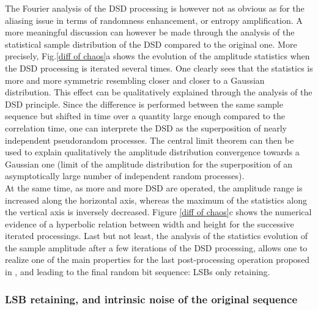 The Fourier analysis of the DSD processing is however not as obvious
as for the aliasing issue in terms of randomness enhancement, or
entropy amplification. A more meaningful discussion can however be
made through the analysis of the statistical sample distribution of
the DSD compared to the original one. More precisely, Fig.\ref{diff of
  chaos}a shows the evolution of the amplitude statistics when the DSD
processing is iterated several times. One clearly sees that the
statistics is more and more symmetric resembling closer and closer to
a Gaussian distribution. This effect can be qualitatively explained
through the analysis of the DSD principle. Since the difference is
performed between the same sample sequence but shifted in time over a
quantity large enough compared to the correlation time, one can
interprete the DSD as the superposition of nearly independent
pseudorandom processes. The central limit theorem can then be used to
explain qualitatively the amplitude distribution convergence towards a
Gaussian one (limit of the amplitude distribution for the
superposition of an asymptotically large number of independent random
processes).\\
At the same time, as more and more DSD are operated, the amplitude
range is increased along the horizontal axis, whereas the maximum of
the statistics along the vertical axis is inversely decreased.  Figure
\ref{diff of chaos}c shows the numerical evidence of a hyperbolic
relation between width and height for the successive iterated
processings. Last but not least, the analysis of the statistics
evolution of the sample amplitude after a few iterations of the DSD
processing, allows one to realize one of the main properties for the
last post-processing operation proposed in
\cite{ultrafast2009,ultrafast2010}, and leading to the final random
bit sequence: LSBs only retaining.


\subsubsection{LSB retaining, and intrinsic noise of the original
  sequence}

